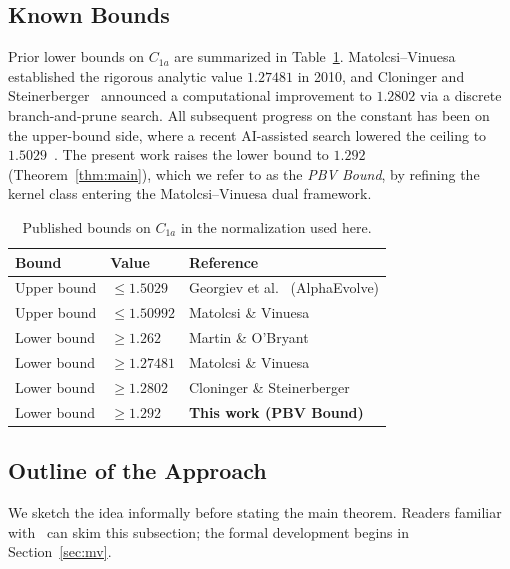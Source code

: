 \documentclass[11pt, letterpaper]{article}
\theoremstyle{plain}
\theoremstyle{definition}
\begin{document}
\subsection{Known Bounds}\label{subsec:intro-bounds}

Prior lower bounds on $C_{1a}$ are summarized in
Table~\ref{tab:published-bounds}.  Matolcsi--Vinuesa~\cite{MV10}
established the rigorous analytic value $1.27481$ in 2010, and
Cloninger and Steinerberger~\cite{CS17} announced a computational
improvement to $1.2802$ via a discrete branch-and-prune search.  All
subsequent progress on the constant has been on the upper-bound
side, where a recent AI-assisted search lowered the ceiling to
$1.5029$~\cite{AlphaEvolve25}.  The present work raises the
lower bound to $1.292$ (Theorem~\ref{thm:main}), which we refer to
as the \emph{PBV Bound}, by refining the kernel class entering the
Matolcsi--Vinuesa dual framework.

\begin{table}[ht]
\centering
\begin{tabular}{l l l}
  \toprule
  \textbf{Bound} & \textbf{Value} & \textbf{Reference} \\
  \midrule
  Upper bound & $\le 1.5029$  & Georgiev et al.~\cite{AlphaEvolve25} (AlphaEvolve) \\
  Upper bound & $\le 1.50992$ & Matolcsi \& Vinuesa~\cite{MV10} \\
  Lower bound & $\ge 1.262$   & Martin \& O'Bryant~\cite{MO2009} \\
  Lower bound & $\ge 1.27481$ & Matolcsi \& Vinuesa~\cite{MV10} \\
  Lower bound & $\ge 1.2802$  & Cloninger \& Steinerberger~\cite{CS17} \\
  Lower bound & $\ge 1.292$   & \textbf{This work (PBV Bound)} \\
  \bottomrule
\end{tabular}
\caption{Published bounds on $C_{1a}$ in the normalization used here.}
\label{tab:published-bounds}
\end{table}

\subsection{Outline of the Approach}\label{subsec:intro-strategy}

We sketch the idea informally before stating the main theorem.  Readers
familiar with~\cite{MV10} can skim this subsection; the formal
development begins in Section~\ref{sec:mv}.
\end{document}
